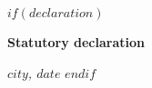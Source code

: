
$if(declaration)$
\cleardoublepage

\thispagestyle{empty}

\vspace*{\fill}

\textbf{Statutory declaration}


\vspace{20mm}

\noindent\textit{$city$, $date$}
$endif$
